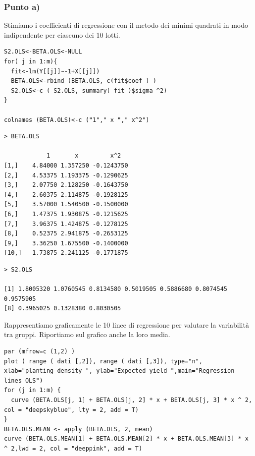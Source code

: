 \subsubsection*{Punto a)}
Stimiamo i coefficienti di regressione con il metodo dei minimi quadrati in modo indipendente per ciascuno dei 10 lotti.
\begin{lstlisting}[style=R]
S2.OLS<-BETA.OLS<-NULL
for( j in 1:m){
  fit<-lm(Y[[j]]~-1+X[[j]])
  BETA.OLS<-rbind (BETA.OLS, c(fit$coef ) )
  S2.OLS<-c ( S2.OLS, summary( fit )$sigma ^2)
}

colnames (BETA.OLS)<-c ("1"," x "," x^2")
\end{lstlisting}

{
\color{red}
\begin{Verbatim}
> BETA.OLS

            1       x         x^2
[1,]    4.84000 1.357250 -0.1243750
[2,]    4.53375 1.193375 -0.1290625
[3,]    2.07750 2.128250 -0.1643750
[4,]    2.60375 2.114875 -0.1928125
[5,]    3.57000 1.540500 -0.1500000
[6,]    1.47375 1.930875 -0.1215625
[7,]    3.96375 1.424875 -0.1278125
[8,]    0.52375 2.941875 -0.2653125
[9,]    3.36250 1.675500 -0.1400000
[10,]   1.73875 2.241125 -0.1771875
\end{Verbatim}
}

{
\color{red}
\begin{Verbatim}
> S2.OLS

[1] 1.8005320 1.0760545 0.8134580 0.5019505 0.5886680 0.8074545 0.9575905
[8] 0.3965025 0.1328380 0.8030505
\end{Verbatim}
}
Rappresentiamo graficamente le 10 linee di regressione per valutare la variabi\-lità tra gruppi. 
Riportiamo sul grafico anche la loro media.
\newpage
\begin{lstlisting}[style=R]
par (mfrow=c (1,2) )
plot ( range ( dati [,2]), range ( dati [,3]), type="n", xlab="planting density ", ylab="Expected yield ",main="Regression lines OLS")
for (j in 1:m) {
  curve (BETA.OLS[j, 1] + BETA.OLS[j, 2] * x + BETA.OLS[j, 3] * x ^ 2, col = "deepskyblue", lty = 2, add = T)
}
BETA.OLS.MEAN <- apply (BETA.OLS, 2, mean)
curve (BETA.OLS.MEAN[1] + BETA.OLS.MEAN[2] * x + BETA.OLS.MEAN[3] * x ^ 2,lwd = 2, col = "deeppink", add = T)
\end{lstlisting}

